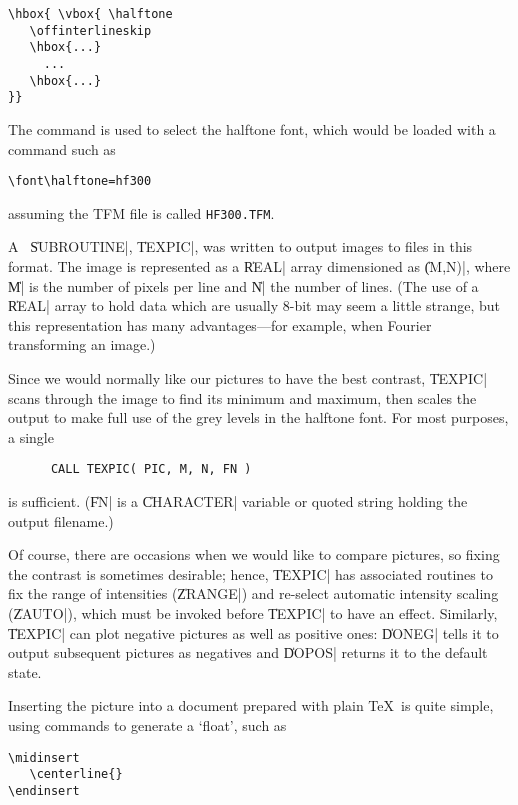 \begin{verbatim}
\hbox{ \vbox{ \halftone
   \offinterlineskip
   \hbox{...}
     ...
   \hbox{...}
}}
\end{verbatim}

\noindent The  command is used to select the halftone
font, which would be loaded with a command such as

\begin{verbatim}
\font\halftone=hf300
\end{verbatim}

\noindent assuming the {\mc TFM} file is called {\tt HF300.TFM}.

A \FTN\ \|SUBROUTINE|, \|TEXPIC|, was written to output images to files
in this format. The image is represented as a \|REAL| array dimensioned
as \|(M,N)|, where \|M| is the number of pixels per line and \|N| the 
number of lines. (The use of a \|REAL| array to hold data which are
usually 8-bit may seem a little strange, but this representation has 
many advantages---for example, when Fourier transforming an image.)

Since we would normally like our pictures to have the best contrast, 
\|TEXPIC| scans through the image to find its minimum and maximum, then
scales the output to make full use of the grey levels in the halftone 
font. For most purposes, a single

\begin{verbatim}
      CALL TEXPIC( PIC, M, N, FN )
\end{verbatim}

\noindent is sufficient. (\|FN| is a \|CHARACTER| variable or quoted 
string holding the output filename.)

Of course, there are occasions when we would like to compare pictures, 
so fixing the contrast is sometimes desirable; hence, \|TEXPIC| has 
associated routines to fix the range of intensities (\|ZRANGE|) and 
re-select automatic intensity scaling (\|ZAUTO|), which must be invoked 
before \|TEXPIC| to have an effect. Similarly, \|TEXPIC| can plot 
negative pictures as well as positive ones: \|DONEG| tells it to output 
subsequent pictures as negatives and \|DOPOS| returns it to the default 
state.

Inserting the picture into a document prepared with plain \TeX\ is
quite simple, using commands to generate a `float', such as

\begin{verbatim}
\midinsert
   \centerline{}
\endinsert
\end{verbatim}

